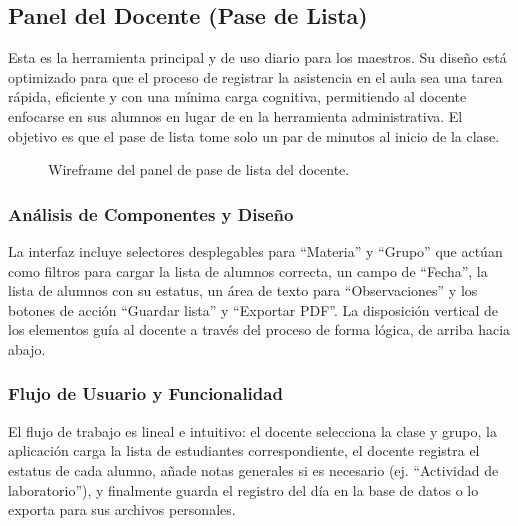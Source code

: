 \subsection{ Panel del Docente (Pase de Lista)}
\begin{samepage}\small
Esta es la herramienta principal y de uso diario para los maestros. Su diseño está optimizado para que el proceso de registrar la asistencia en el aula sea una tarea rápida, eficiente y con una mínima carga cognitiva, permitiendo al docente enfocarse en sus alumnos en lugar de en la herramienta administrativa. El objetivo es que el pase de lista tome solo un par de minutos al inicio de la clase.
\begin{figure}[H]\centering
    \caption{Wireframe del panel de pase de lista del docente.}\label{fig:wf-teacher-panel}
\end{figure}
    \subsubsection*{Análisis de Componentes y Diseño}
    La interfaz incluye selectores desplegables para ``Materia'' y ``Grupo'' que actúan como filtros para cargar la lista de alumnos correcta, un campo de ``Fecha'', la lista de alumnos con su estatus, un área de texto para ``Observaciones'' y los botones de acción ``Guardar lista'' y ``Exportar PDF''. La disposición vertical de los elementos guía al docente a través del proceso de forma lógica, de arriba hacia abajo.
    
    \subsubsection*{Flujo de Usuario y Funcionalidad}
    El flujo de trabajo es lineal e intuitivo: el docente selecciona la clase y grupo, la aplicación carga la lista de estudiantes correspondiente, el docente registra el estatus de cada alumno, añade notas generales si es necesario (ej. ``Actividad de laboratorio''), y finalmente guarda el registro del día en la base de datos o lo exporta para sus archivos personales.
\normalsize\end{samepage}
\clearpage


